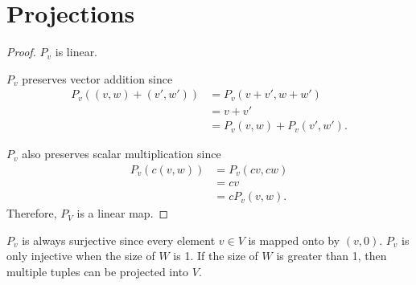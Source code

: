 \section{Projections}

\begin{proof}$P_v$ is linear.\gap

    $P_v$ preserves vector addition since
    \begin{align*}
        P_v((v,w)+(v',w')) 
        &= P_v(v+v',w+w')\\ 
        &= v+v'\\
        &= P_v(v,w) + P_v(v',w').
    \end{align*}

    $P_v$ also preserves scalar multiplication since
    \begin{align*}
        P_v(c(v,w)) 
        &= P_v(cv,cw)\\ 
        &= cv\\
        &= cP_v(v,w).
    \end{align*}
    Therefore, $P_V$ is a linear map.
\end{proof}

$P_v$ is always surjective since every element $v \in V$
is mapped onto by $(v,0)$.
$P_v$ is only injective when the size of $W$ is 1.
If the size of $W$ is greater than 1, 
then multiple tuples can be projected into $V$.